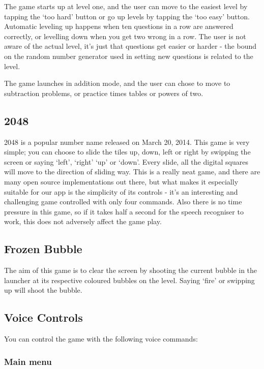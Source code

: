 \documentclass[11pt, oneside]{article}
\begin{document}
The game starts up at level one, and the user can move to the easiest
level by tapping the `too hard' button or go up levels by tapping the
`too easy' button. Automatic leveling up happens when ten questions in
a row are answered correctly, or levelling down when you get two wrong
in a row. The user is not aware of the actual level, it's just that
questions get easier or harder - the bound on the random number
generator used in setting new questions is related to the level.

The game launches in addition mode, and the user can chose to move to
subtraction problems, or practice times tables or powers of two.

\subsection{2048}

2048 is a popular number name released on March 20, 2014. This game is
very simple; you can choose to slide the tiles up, down, left or right
by swipping the screen or saying `left', `right' `up' or `down'. Every
slide, all the digital squares will move to the direction of sliding
way. This is a really neat game, and there are many open source
implementations out there, but what makes it especially suitable for
our app is the simplicity of its controls - it's an interesting and
challenging game controlled with only four commands. Also there is no
time pressure in this game, so if it takes half a second for the
speech recogniser to work, this does not adversely affect the game
play.

\subsection{Frozen Bubble}
The aim of this game is to clear the screen by shooting the current
bubble in the launcher at its respective coloured bubbles on the
level. Saying `fire' or swipping up will shoot the bubble.

\subsection{Voice Controls}

You can control the game with the following voice commands:

\subsubsection{Main menu}
\end{document}
